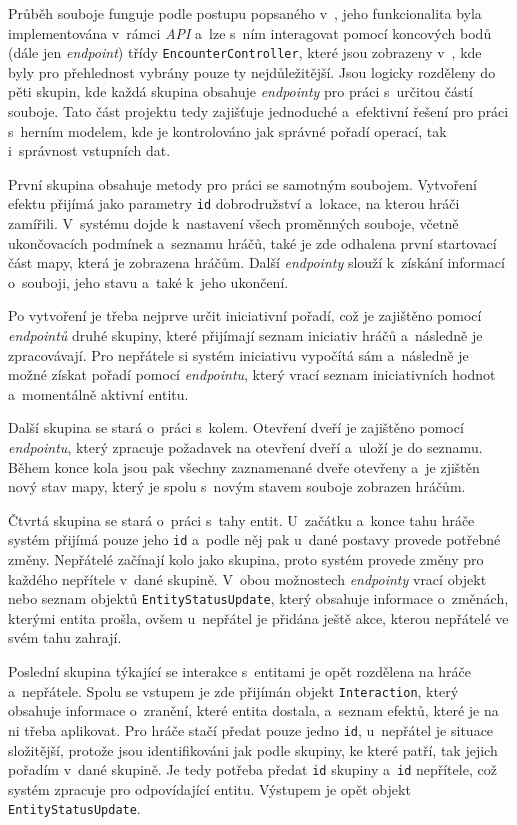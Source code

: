 Průběh souboje funguje podle postupu popsaného v~, jeho funkcionalita byla implementována v~rámci \textit{API} a~lze s~ním interagovat pomocí koncových bodů (dále jen \textit{endpoint}) třídy \texttt{EncounterController}, které jsou zobrazeny v~, kde byly pro přehlednost vybrány pouze ty nejdůležitější. Jsou logicky rozděleny do pěti skupin, kde každá skupina obsahuje \textit{endpointy} pro práci s~určitou částí souboje. Tato část projektu tedy zajišťuje jednoduché a~efektivní řešení pro práci s~herním modelem, kde je kontrolováno jak správné pořadí operací, tak i~správnost vstupních dat.



První skupina obsahuje metody pro práci se samotným soubojem. Vytvoření efektu přijímá jako parametry \texttt{id} dobrodružství a~lokace, na kterou hráči zamířili. V~systému dojde k~nastavení všech proměnných souboje, včetně ukončovacích podmínek a~seznamu hráčů, také je zde odhalena první startovací část mapy, která je zobrazena hráčům. Další \textit{endpointy} slouží k~získání informací o~souboji, jeho stavu a~také k~jeho ukončení.

Po vytvoření je třeba nejprve určit iniciativní pořadí, což je zajištěno pomocí \textit{endpointů} druhé skupiny, které přijímají seznam iniciativ hráčů a~následně je zpracovávají. Pro nepřátele si systém iniciativu vypočítá sám a~následně je možné získat pořadí pomocí \textit{endpointu}, který vrací seznam iniciativních hodnot a~momentálně aktivní entitu.

Další skupina se stará o~práci s~kolem. Otevření dveří je zajištěno pomocí \textit{endpointu}, který zpracuje požadavek na otevření dveří a~uloží je do seznamu. Během konce kola jsou pak všechny zaznamenané dveře otevřeny a~je zjištěn nový stav mapy, který je spolu s~novým stavem souboje zobrazen hráčům.

Čtvrtá skupina se stará o~práci s~tahy entit. U~začátku a~konce tahu hráče systém přijímá pouze jeho \texttt{id} a~podle něj pak u~dané postavy provede potřebné změny. Nepřátelé začínají kolo jako skupina, proto systém provede změny pro každého nepřítele v~dané skupině. V~obou možnostech \textit{endpointy} vrací objekt nebo seznam objektů \texttt{EntityStatusUpdate}, který obsahuje informace o~změnách, kterými entita prošla, ovšem u~nepřátel je přidána ještě akce, kterou nepřátelé ve svém tahu zahrají.

Poslední skupina týkající se interakce s~entitami je opět rozdělena na hráče a~nepřátele. Spolu se vstupem je zde přijímán objekt \texttt{Interaction}, který obsahuje informace o~zranění, které entita dostala, a~seznam efektů, které je na ni třeba aplikovat. Pro hráče stačí předat pouze jedno \texttt{id}, u~nepřátel je situace složitější, protože jsou identifikováni jak podle skupiny, ke které patří, tak jejich pořadím v~dané skupině. Je tedy potřeba předat \texttt{id} skupiny a~\texttt{id} nepřítele, což systém zpracuje pro odpovídající entitu. Výstupem je opět objekt \texttt{EntityStatusUpdate}.

